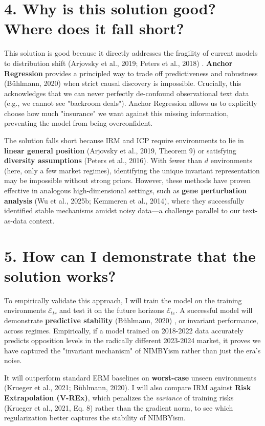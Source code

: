\documentclass[11pt]{article}
\begin{document}
\section*{4. Why is this solution good? Where does it fall short?}
This solution is good because it directly addresses the fragility of current models to distribution shift (Arjovsky et al., 2019; Peters et al., 2018) %
. \textbf{Anchor Regression} provides a principled way to trade off predictiveness and robustness (Bühlmann, 2020) %
when strict causal discovery is impossible.
    Crucially, this acknowledges that we can never perfectly de-confound observational text data (e.g., we cannot see "backroom deals"). Anchor Regression allows us to explicitly choose how much "insurance" we want against this missing information, preventing the model from being overconfident.

The solution falls short because IRM and ICP require environments to lie in \textbf{linear general position} (Arjovsky et al., 2019, Theorem 9) or satisfying \textbf{diversity assumptions} (Peters et al., 2016).
With fewer than $d$ environments (here, only a few market regimes), identifying the unique invariant representation may be impossible without strong priors. However, these methods have proven effective in analogous high-dimensional settings, such as \textbf{gene perturbation analysis} (Wu et al., 2025b; Kemmeren et al., 2014), where they successfully identified stable mechanisms amidst noisy data—a challenge parallel to our text-as-data context.

\section*{5. How can I demonstrate that the solution works?}
To empirically validate this approach, I will train the model on the training environments $\mathcal{E}_{tr}$ and test it on the future horizons $\mathcal{E}_{te}$. A successful model will demonstrate \textbf{predictive stability} (Bühlmann, 2020) %
, or invariant performance, across regimes.
    Empirically, if a model trained on 2018-2022 data accurately predicts opposition levels in the radically different 2023-2024 market, it proves we have captured the "invariant mechanism" of NIMBYism rather than just the era's noise.

It will outperform standard ERM baselines on \textbf{worst-case} unseen environments (Krueger et al., 2021; Bühlmann, 2020).
I will also compare IRM against \textbf{Risk Extrapolation (V-REx)}, which penalizes the \textit{variance} of training risks (Krueger et al., 2021, Eq. 8) rather than the gradient norm, to see which regularization better captures the stability of NIMBYism.
\end{document}
